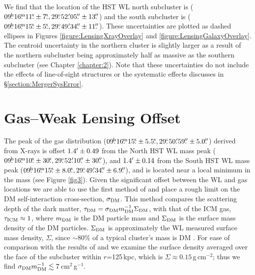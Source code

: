 We find that the location of the HST WL north subcluster is ($09\fh16\fm11\fs\pm7\fs, 29\fdg52\farcm05\farcs\pm13\farcs$) and the south subcluster is ($09\fh16\fm15\fs\pm5\fs, 29\fdg49\farcm34\farcs\pm11\farcs$).
These uncertainties are plotted as dashed ellipses in Figures \ref{figure:LensingXrayOverlay} and \ref{figure:LensingGalaxyOverlay}.
The centroid uncertainty in the northern cluster is slightly larger as a result of the northern subcluster being approximately half as massive as the southern subcluster (see Chapter \ref{chapter:2}).
Note that these uncertainties do not include the effects of line-of-sight structures or the systematic effects discusses in \S\ref{section:MergerSysError}.


\section{Gas--Weak Lensing Offset}\label{section:GasWLOffset}

The peak of the gas distribution ($09\fh16\fm15\fs\pm5.5\fs, 29\fdg50\farcm59\farcs\pm5.0\farcs$) derived from X-rays is offset $1.4\mbox{$^\prime$}\pm0.49$ from the North HST WL mass peak ($09\fh16\fm10\fs\pm30\fs, 29\fdg52\farcm10\farcs\pm30\farcs$), and $1.4\mbox{$^\prime$}\pm0.14$ from the South HST WL mass peak ($09\fh16\fm15\fs\pm8.0\fs, 29\fdg49\farcm34\farcs\pm6.9\farcs$), and is located near a local minimum in the mass (see Figure \ref{fig3}).
Given the significant offset between the WL and gas locations we are able to use the first method of \citet{Markevitch:2004dl} and place a rough limit on the DM self-interaction cross-section, $\sigma_{\rm DM}$.
This method compares the scattering depth of the dark matter, $\tau_{\rm DM}=\sigma_{\rm DM}m^{-1}_{\rm DM} \Sigma_{\rm DM}$, with that of the ICM gas, $\tau_{\rm ICM}\approx 1$, where $m_{\rm DM}$ is the DM particle mass and $\Sigma_{\rm DM}$ is the surface mass density of the DM particles.
$\Sigma_{\rm DM}$ is approximately the WL measured surface mass density, $\Sigma$, since $\sim80\%$ of a typical cluster's mass is DM \citep{Diaferio:2008js}.
For ease of comparison with the results of \citet{Markevitch:2004dl} and \citet{Merten:2011gu} we examine the surface density averaged over the face of the subcluster within $r$=125\,kpc, which is $\Sigma\approx0.15$\,g\,cm$^{-2}$; thus we find $\sigma_{\rm DM} m_{\rm DM}^{-1} \lesssim 7$\,cm$^2$\,g$^{-1}$. 


